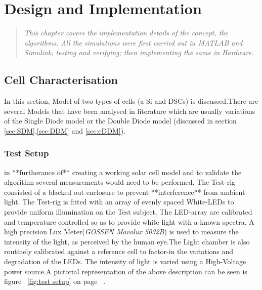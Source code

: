 \chapter{Design and Implementation}
\begin{quote} 
\it This chapter covers the implementation details of the concept, the algorithms. All the simulations were first carried out in MATLAB{\textregistered} and Simulink{\textregistered}, testing and verifying; then implementing the same in Hardware.
\end{quote}


\section{Cell Characterisation}
In this section, Model of two types of cells (\ac{a-Si} and \ac{DSCs}) is discussed.There are several Models that have been analysed in literature which are usually variations of the Single Diode model or the Double Diode model (discussed in section \ref{sec:SDM},\ref{sec:DDM} and \ref{sec:eDDM}).
 
\subsection{Test Setup}
in **furtherance of** creating a working solar cell model and to validate the algorithm several measurements would need to be performed. The Test-rig consisted of a blacked out enclosure to prevent **interference** from ambient light. The Test-rig is fitted with an array of evenly spaced White-\ac{LED}s to provide uniform illumination on the Test subject. The \ac{LED}-array are calibrated and temperature controlled so as to provide white light with a known spectra. A high precision Lux Meter(\textit{GOSSEN Mavolux 5032B}) is used to measure the  intensity of the light, as perceived by the human eye.The Light chamber is also routinely calibrated against a reference cell to factor-in the variations and degradation of the \ac{LED}s. The intensity of light is varied using a High-Voltage power source.A pictorial representation of the above description can be seen is figure  ~\ref{fig:test setup} on page ~\pageref{fig:test setup}. \\


